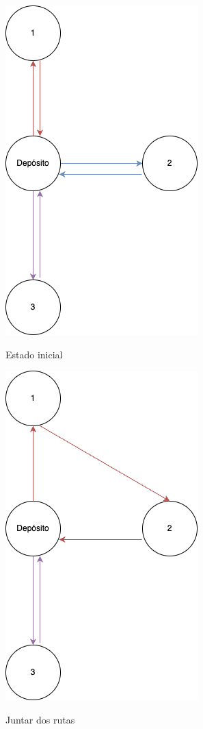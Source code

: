 \documentclass{article}
\begin{document}
\begin{minipage}{0.5\textwidth}
    \begin{figure}[H]
        \includegraphics[scale = 0.3]{images/greedy.png}
        \label{fig: inicial}
        \caption{Estado inicial}
    \end{figure}
\end{minipage}
\begin{minipage}{0.5\textwidth}
    \begin{figure}[H]
        \includegraphics[scale = 0.3]{images/greedy2.png}
        \label{fig: merge}
        \caption{Juntar dos rutas}
    \end{figure}
\end{minipage}
\end{document}
